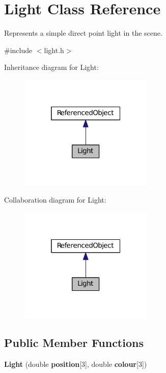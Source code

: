 \section{Light Class Reference}
\label{class_light}


Represents a simple direct point light in the scene.  




{\ttfamily \#include $<$light.\+h$>$}



Inheritance diagram for Light\+:
\nopagebreak
\begin{figure}[H]
\begin{center}
\leavevmode
\includegraphics[width=181pt]{class_light__inherit__graph}
\end{center}
\end{figure}


Collaboration diagram for Light\+:
\nopagebreak
\begin{figure}[H]
\begin{center}
\leavevmode
\includegraphics[width=181pt]{class_light__coll__graph}
\end{center}
\end{figure}
\subsection*{Public Member Functions}
\begin{DoxyCompactItemize}
\item 
{\bf Light} (double {\bf position}[3], double {\bf colour}[3])
\end{DoxyCompactItemize}
